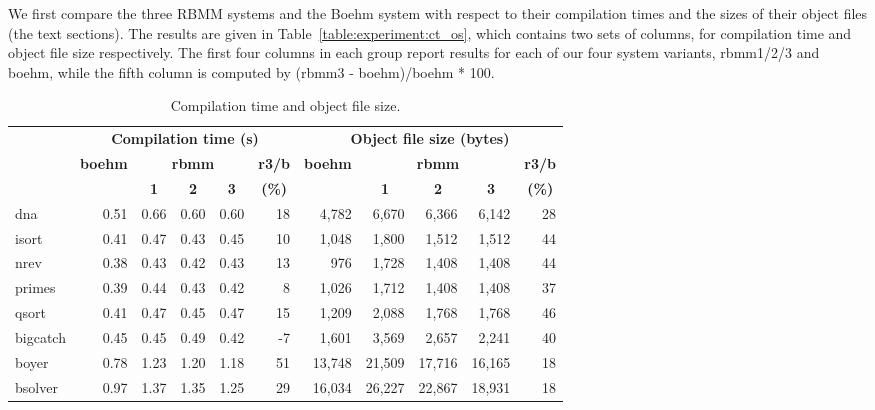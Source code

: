 \documentclass{tlp}
\begin{document}
We first compare the three RBMM systems and the Boehm system
with respect to their compilation times and the sizes of their object files
(the text sections).
The results are given in Table~\ref{table:experiment:ct_os}, which contains
two sets of columns, for compilation time and object file size respectively.
The first four columns in each group report results
for each of our four system variants, rbmm1/2/3 and boehm,
while the fifth column is computed by (rbmm3 - boehm)/boehm * 100.

\begin{table}[ht]
  \centering
  \scriptsize
  \caption{Compilation time and object file size.}
  \begin{tabular}{l|*{4}{r|}r||*{5}{r|}}
    \hline
    \hline
    \multirow{3}{*}{}
    & \multicolumn{5}{c||}{\textbf{Compilation time (s)}}
    & \multicolumn{5}{c|}{\textbf{Object file size (bytes)}} \\
    & \multicolumn{1}{c|}{\multirow{2}{*}{\textbf{boehm}}}
    & \multicolumn{3}{c|}{\textbf{rbmm}}
    & \multicolumn{1}{c||}{\textbf{r3/b}}
    & \multicolumn{1}{c|}{\multirow{2}{*}{\textbf{boehm}}}
    & \multicolumn{3}{c|}{\textbf{rbmm}}
    & \multicolumn{1}{c|}{\textbf{r3/b}}\\
    &
    & \multicolumn{1}{c}{\textbf{1}}
    & \multicolumn{1}{c}{\textbf{2}}
    & \multicolumn{1}{c|}{\textbf{3}}
    & \multicolumn{1}{c||}{\textbf{(\%)}}
    &
    & \multicolumn{1}{c}{\textbf{1}}
    & \multicolumn{1}{c}{\textbf{2}}
    & \multicolumn{1}{c|}{\textbf{3}}
    & \multicolumn{1}{c|}{\textbf{(\%)}}\\
    \hline
    dna      & 0.51 & 0.66 & 0.60 & 0.60 & 18 &  4,782 &  6,670 &  6,366 &  6,142 & 28 \\
    isort    & 0.41 & 0.47 & 0.43 & 0.45 & 10 &  1,048 &  1,800 &  1,512 &  1,512 & 44 \\
    nrev     & 0.38 & 0.43 & 0.42 & 0.43 & 13 &    976 &  1,728 &  1,408 &  1,408 & 44 \\
    primes   & 0.39 & 0.44 & 0.43 & 0.42 &  8 &  1,026 &  1,712 &  1,408 &  1,408 & 37 \\
    qsort    & 0.41 & 0.47 & 0.45 & 0.47 & 15 &  1,209 &  2,088 &  1,768 &  1,768 & 46 \\
    \hline
    bigcatch & 0.45 & 0.45 & 0.49 & 0.42 & -7 &  1,601 &  3,569 &  2,657 &  2,241 & 40 \\
    boyer    & 0.78 & 1.23 & 1.20 & 1.18 & 51 & 13,748 & 21,509 & 17,716 & 16,165 & 18 \\
    bsolver  & 0.97 & 1.37 & 1.35 & 1.25 & 29 & 16,034 & 26,227 & 22,867 & 18,931 & 18 \\

\end{tabular}
\end{table}
\end{document}
